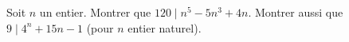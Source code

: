 Soit $n$ un entier. Montrer que $120 \mid n^5 - 5n^3 + 4n$. Montrer aussi que $9 \mid 4^n + 15n - 1$ (pour $n$ entier naturel).
